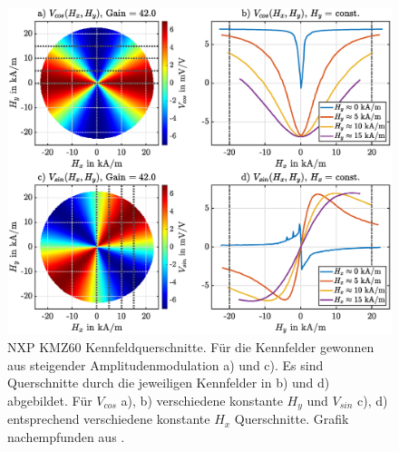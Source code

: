 \begin{figure}[tbph]
	\centering
	\includegraphics[width=\linewidth]{appendix/images/4-KMZ60/KMZ60_Kennfeld_Steigend}
	\caption[NXP KMZ60 Kennfeldquerschnitte]{NXP KMZ60 Kennfeldquerschnitte. Für die Kennfelder gewonnen aus 
		steigender Amplitudenmodulation a) und c). Es sind Querschnitte durch die jeweiligen Kennfelder in b) und d) 
		abgebildet. Für $V_{cos}$ a), b) verschiedene konstante $H_y$ und $V_{sin}$ c), d) entsprechend verschiedene 
		konstante $H_x$ Querschnitte. Grafik nachempfunden aus \cite{Schuethe2019}.}
	\label{fig:kmz60kennfeldsteigend}
\end{figure}




